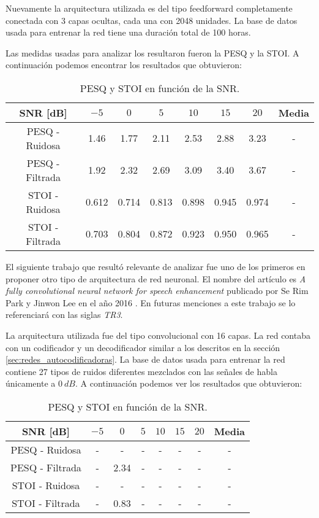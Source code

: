 Nuevamente la arquitectura utilizada es del tipo feedforward completamente conectada con 3 capas ocultas, cada una con 2048 unidades. La base de datos usada para entrenar la red tiene una duración total de 100 horas. 

Las medidas usadas para analizar los resultaron fueron la PESQ y la STOI. A continuación podemos encontrar los resultados que obtuvieron:

\begin{table}[H]
	\centering
	\begin{tabular}{ |c|c|c|c|c|c|c|c| } 
		\hline
		SNR [dB] & $-5$ & $0$ & $5$ & $10$ & $15$ & $20$ & Media \\ 
		\hline
		PESQ - Ruidosa & 1.46 & 1.77 & 2.11 & 2.53 & 2.88 & 3.23 & - \\
		PESQ - Filtrada & 1.92 & 2.32 & 2.69 & 3.09 & 3.40 & 3.67 & - \\
		\hline
		STOI - Ruidosa & 0.612 & 0.714 & 0.813 & 0.898 & 0.945 & 0.974 & - \\
		STOI - Filtrada & 0.703 & 0.804 & 0.872 & 0.923 & 0.950 & 0.965 & - \\
		\hline
	\end{tabular}
	\caption{PESQ y STOI en función de la SNR.}
\end{table}

El siguiente trabajo que resultó relevante de analizar fue uno de los primeros en proponer otro tipo de arquitectura de red neuronal. El nombre del artículo es \emph{A fully convolutional neural network for speech enhancement} publicado por Se Rim Park y Jinwon Lee en el año 2016 \cite{a_fully_convolutional_neural_network_for_speech_enhancement}.  En futuras menciones a este trabajo se lo referenciará con las siglas \emph{TR3}.

La arquitectura utilizada fue del tipo convolucional con 16 capas. La red contaba con un codificador y un decodificador similar a los descritos en la sección \ref{sec:redes_autocodificadoras}. La base de datos usada para entrenar la red contiene 27 tipos de ruidos diferentes mezclados con las señales de habla únicamente a $\SI{0}{dB}$. A continuación podemos ver los resultados que obtuvieron:

\begin{table}[H]
	\centering
	\begin{tabular}{ |c|c|c|c|c|c|c|c| } 
		\hline
		SNR [dB] & $-5$ & $0$ & $5$ & $10$ & $15$ & $20$ & Media \\ 
		\hline
		PESQ - Ruidosa & - & - & - & - & - & - & - \\
		PESQ - Filtrada & - & 2.34 & - & - & - & - & - \\
		\hline
		STOI - Ruidosa & - & - & - & - & - & - & - \\
		STOI - Filtrada & - & 0.83 & - & - & - & - & - \\
		\hline
	\end{tabular}
	\caption{PESQ y STOI en función de la SNR.}
\end{table}


